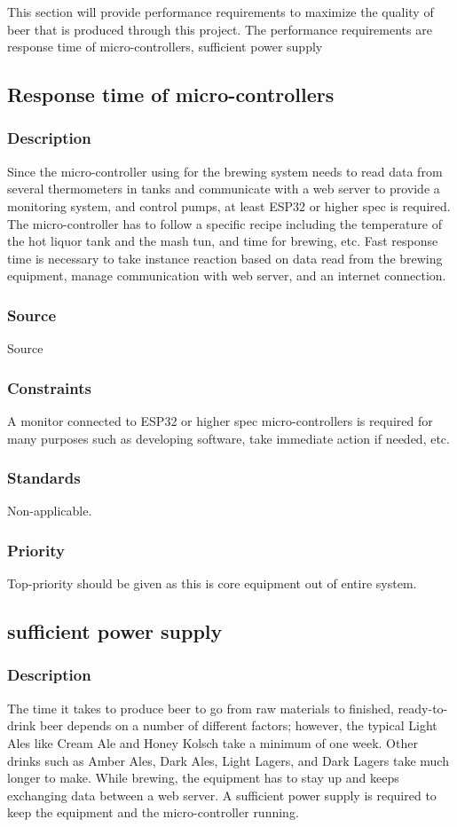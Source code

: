 This section will provide performance requirements to maximize the quality of beer that is produced through this project. The performance requirements are response time of micro-controllers, sufficient power supply

\subsection{Response time of micro-controllers}
\subsubsection{Description}
Since the micro-controller using for the brewing system needs to read data from several thermometers in tanks and communicate with a web server to provide a monitoring system, and control pumps, at least ESP32 or higher spec is required. The micro-controller has to follow a specific recipe including the temperature of the hot liquor tank and the mash tun, and time for brewing, etc.  Fast response time is necessary to take instance reaction based on data read from the brewing equipment, manage communication with web server, and an internet connection.
\subsubsection{Source}
Source
\subsubsection{Constraints}
A monitor connected to ESP32 or higher spec micro-controllers is required for many purposes such as developing software, take immediate action if needed, etc.
\subsubsection{Standards}
Non-applicable.
\subsubsection{Priority}
Top-priority should be given as this is core equipment out of entire system.
\newline

\subsection{sufficient power supply}

\subsubsection{Description}
The time it takes to produce beer to go from raw materials to finished, ready-to-drink beer depends on a number of different factors; however, the typical Light Ales like Cream Ale and Honey Kolsch take a minimum of one week. Other drinks such as Amber Ales, Dark Ales, Light Lagers, and Dark Lagers take much longer to make. While brewing, the equipment has to stay up and keeps exchanging data between a web server. A sufficient power supply is required to keep the equipment and the micro-controller running.
